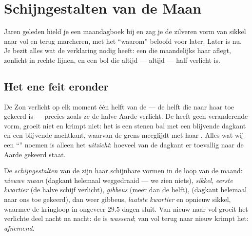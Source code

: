 \chapter{Schijngestalten van de Maan}\label{ch:g7:moon-phases}

Jaren geleden hield je een maandagboek bij en zag je de zilveren vorm
van sikkel naar vol en terug marcheren, met het ``waarom'' beloofd
voor later. Later is nu. Je bezit alles wat de verklaring nodig heeft:
een  die maandelijks haar  aflegt, zonlicht in rechte
lijnen, en een bol die altijd --- altijd --- half verlicht is.

\section{Het ene feit eronder}

\begin{proposition}\label{prop:g7:moon-phases:halflit}
De Zon verlicht op elk moment één helft van de  --- de helft
die naar haar toe gekeerd is --- precies zoals ze de halve Aarde
verlicht. De  heeft geen veranderende vorm, groeit niet en
krimpt niet: het is een stenen bal met een blijvende dagkant en een
blijvende nachtkant, waarvan de grens meeglijdt met haar
. Alles wat wij een ``'' noemen is alleen
het \emph{uitzicht}: hoeveel van de dagkant er toevallig naar de Aarde
gekeerd staat.
\end{proposition}

\begin{definition}[Schijngestalten]\label{def:g7:moon-phases:phases}
De \emph{schijngestalten} van de  zijn haar
schijnbare vormen in de loop van de maand: \emph{nieuwe maan} (dagkant
helemaal weggedraaid --- we zien niets), \emph{sikkel},
\emph{eerste kwartier} (de halve schijf verlicht), \emph{gibbeus}
(meer dan de helft), \emph{} (dagkant helemaal naar ons toe
gekeerd), dan weer gibbeus, \emph{laatste kwartier} en opnieuw
sikkel, waarmee de kringloop in ongeveer $29.5$ dagen sluit. Van
nieuw naar vol groeit het verlichte deel nacht na nacht: de
 is \emph{wassend}; van vol terug naar nieuw
krimpt het: \emph{afnemend}.
\end{definition}

